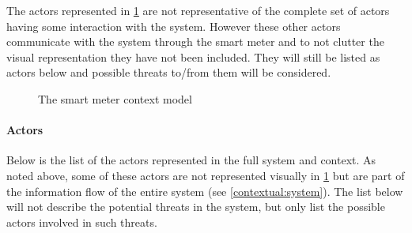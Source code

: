 The actors represented in \cref{contextual:sm_model} are not representative of the complete set of actors having some interaction with the system.
However these other actors communicate with the system through the smart meter and to not clutter the visual representation they have not been included.
They will still be listed as actors below and possible threats to/from them will be considered.

\begin{figure}[h]
  \centering
  
  \caption{The smart meter context model}
  \label{contextual:sm_model}
\end{figure}

\paragraph{Actors}\label{contextActors}
Below is the list of the actors represented in the full system and context.
As noted above, some of these actors are not represented visually in \cref{contextual:sm_model} but are part of the information flow of the entire system (see \cref{contextual:system}).
The list below will not describe the potential threats in the system, but only list the possible actors involved in such threats.
